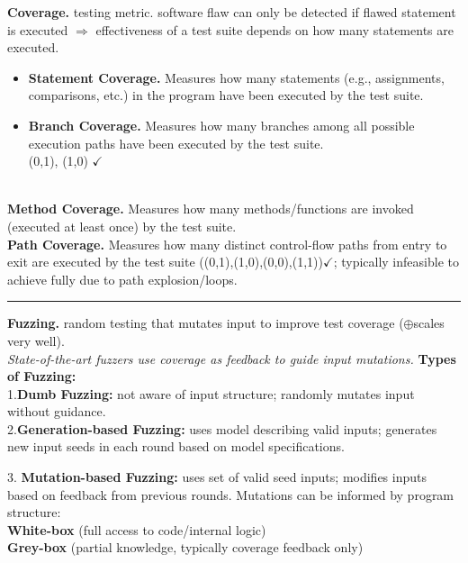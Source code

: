 \documentclass[9pt, a4paper]{extarticle}
\makeatletter
\renewcommand{\hline}{\noalign{\vskip 2px}\hrule\@height\arrayrulewidth\@width\linewidth\noalign{\vskip 2px}}
\makeatother
\begin{document}
\begin{minipage}[t]{0.5\textwidth}
\begin{minipage}[htp]{0.51\textwidth}
\begin{itemize}[leftmargin=4pt, labelsep=1pt]
		\end{itemize}
	\end{minipage}\hfill
	\begin{minipage}[htp]{0.47\textwidth}
		\textbf{Coverage.} testing metric. software flaw can only be detected if flawed statement is executed $\Rightarrow$ effectiveness of a test suite depends on how many statements are executed.
		\begin{itemize}
			\item[-] \textbf{Statement Coverage.} Measures how many statements (e.g., assignments, comparisons, etc.) in the program have been executed by the test suite.
			\item[-] \textbf{Branch Coverage.} Measures how many branches among all possible execution paths have been executed by the test suite. \\(0,1), (1,0) $\checkmark$
		\end{itemize}
	\end{minipage}\\
	\textbf{Method Coverage.} Measures how many methods/functions are invoked (executed at least once) by the test suite.\\
	\textbf{Path Coverage.} Measures how many distinct control-flow paths from entry to exit are executed by the test suite ((0,1),(1,0),(0,0),(1,1))$\checkmark$; typically infeasible to achieve fully due to path explosion/loops.\hline
	\begin{minipage}[t]{0.495\textwidth}
		\textbf{Fuzzing.} random testing that mutates input to improve test coverage ($\oplus$scales very well). \\
		\textit{State-of-the-art fuzzers use coverage as feedback to guide input mutations.} \textbf{Types of Fuzzing:}\\
		1.\textbf{Dumb Fuzzing:} not aware of input structure; randomly mutates input without guidance.\\
		2.\textbf{Generation-based Fuzzing:} uses model describing valid inputs; generates new input seeds in each round based on model specifications.
	\end{minipage}\hfill
	\begin{minipage}[t]{0.495\textwidth}
		3. \textbf{Mutation-based Fuzzing:} uses set of valid seed inputs; modifies inputs based on feedback from previous rounds. Mutations can be informed by program structure:\\
		\textbf{White-box} (full access to code/internal logic)\\
		\textbf{Grey-box} (partial knowledge, typically coverage feedback only)\\

\end{minipage}
\end{minipage}
\end{document}
